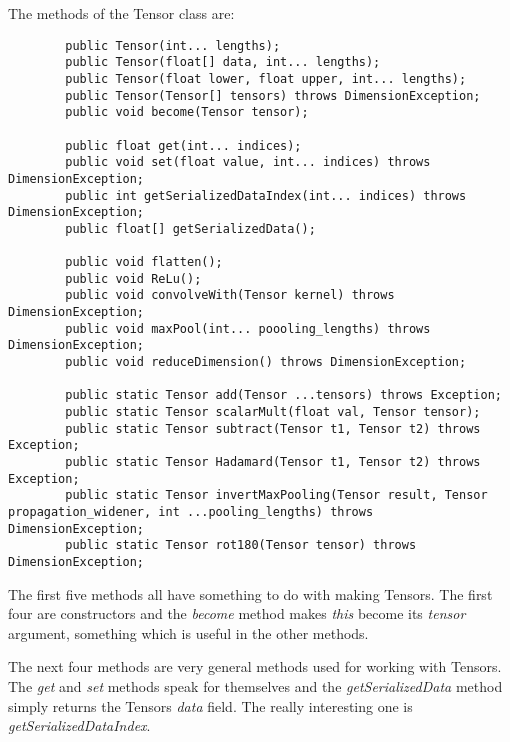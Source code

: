 \documentclass[12pt, titlepage]{article}
\begin{document}
		The methods of the Tensor class are:
		\begin{lstlisting}
		public Tensor(int... lengths);
		public Tensor(float[] data, int... lengths);
		public Tensor(float lower, float upper, int... lengths);
		public Tensor(Tensor[] tensors) throws DimensionException;
		public void become(Tensor tensor);
		
		public float get(int... indices);
		public void set(float value, int... indices) throws DimensionException;
		public int getSerializedDataIndex(int... indices) throws DimensionException;
		public float[] getSerializedData();
		
		public void flatten();
		public void ReLu();
		public void convolveWith(Tensor kernel) throws DimensionException;
		public void maxPool(int... poooling_lengths) throws DimensionException;
		public void reduceDimension() throws DimensionException;
		
		public static Tensor add(Tensor ...tensors) throws Exception;
		public static Tensor scalarMult(float val, Tensor tensor);
		public static Tensor subtract(Tensor t1, Tensor t2) throws Exception;
		public static Tensor Hadamard(Tensor t1, Tensor t2) throws Exception;
		public static Tensor invertMaxPooling(Tensor result, Tensor propagation_widener, int ...pooling_lengths) throws DimensionException;
		public static Tensor rot180(Tensor tensor) throws DimensionException;
		\end{lstlisting}
		The first five methods all have something to do with making Tensors. The first four are constructors and the \textit{become} method makes \textit{this} become its \textit{tensor} argument, something which is useful in the other methods.
		
		The next four methods are very general methods used for working with Tensors. The \textit{get} and \textit{set} methods speak for themselves and the \textit{getSerializedData} method simply returns the Tensors \textit{data} field. The really interesting one is \textit{getSerializedDataIndex}. 	
		
\end{document}
